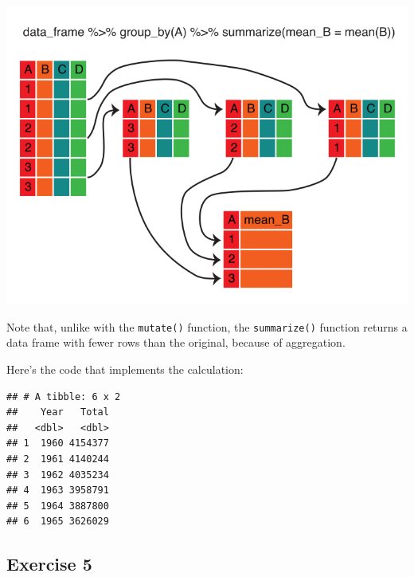 \documentclass[
]{book}
\newenvironment{Shaded}{\begin{snugshade}}{\end{snugshade}}
\newcommand{\DataTypeTok}[1]{\textcolor[rgb]{0.13,0.29,0.53}{#1}}
\newcommand{\KeywordTok}[1]{\textcolor[rgb]{0.13,0.29,0.53}{\textbf{#1}}}
\newcommand{\NormalTok}[1]{#1}
\newcommand{\OperatorTok}[1]{\textcolor[rgb]{0.81,0.36,0.00}{\textbf{#1}}}
\newcommand{\StringTok}[1]{\textcolor[rgb]{0.31,0.60,0.02}{#1}}
\begin{document}
\includegraphics{R/Rintro/images/summarize_group_by.png}

Note that, unlike with the \texttt{mutate()} function, the \texttt{summarize()} function returns a data frame
with fewer rows than the original, because of aggregation.

Here's the code that implements the calculation:

\begin{Shaded}
\end{Shaded}

\begin{verbatim}
## # A tibble: 6 x 2
##    Year   Total
##   <dbl>   <dbl>
## 1  1960 4154377
## 2  1961 4140244
## 3  1962 4035234
## 4  1963 3958791
## 5  1964 3887800
## 6  1965 3626029
\end{verbatim}

\hypertarget{exercise-5}{%
\subsection{Exercise 5}\label{exercise-5}}
\end{document}
